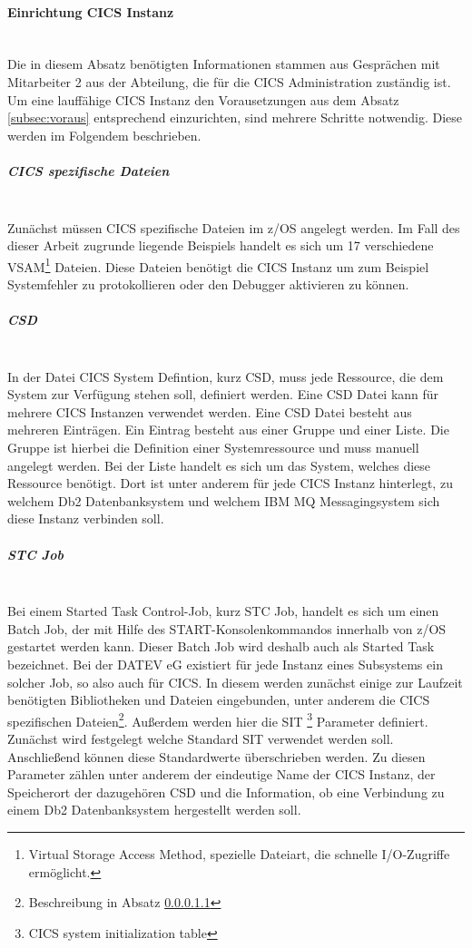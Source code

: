 \paragraph{Einrichtung CICS Instanz}\label{subsec:createCICS}~\\
Die in diesem Absatz benötigten Informationen stammen aus Gesprächen mit Mitarbeiter 2 aus der Abteilung, die für die CICS Administration zuständig ist.
Um eine lauffähige CICS Instanz den Vorausetzungen aus dem Absatz \ref{subsec:voraus} entsprechend einzurichten, sind mehrere Schritte notwendig.
Diese werden im Folgendem beschrieben.

\subparagraph{CICS spezifische Dateien}\label{sssec:speziDat} ~\\
Zunächst müssen CICS spezifische Dateien im z/OS angelegt werden.
Im Fall des dieser Arbeit zugrunde liegende Beispiels handelt es sich um 17 verschiedene VSAM\footnote{Virtual Storage Access Method, spezielle Dateiart, die schnelle I/O-Zugriffe ermöglicht.\cite{Lovelace.2013}} Dateien.
Diese Dateien benötigt die CICS Instanz um zum Beispiel Systemfehler zu protokollieren oder den Debugger aktivieren zu können.

\subparagraph{CSD} ~\\
In der Datei \glqq CICS System Defintion\grqq, kurz CSD, muss jede Ressource, die dem System zur Verfügung stehen soll, definiert werden.
Eine CSD Datei kann für mehrere CICS Instanzen verwendet werden.
Eine CSD Datei besteht aus mehreren Einträgen.
Ein Eintrag besteht aus einer Gruppe und einer Liste.
Die Gruppe ist hierbei die Definition einer Systemressource und muss manuell angelegt werden.
Bei der Liste handelt es sich um das System, welches diese Ressource benötigt.
Dort ist unter anderem für jede CICS Instanz hinterlegt, zu welchem Db2 Datenbanksystem und welchem IBM MQ Messagingsystem sich diese Instanz verbinden soll.

\subparagraph{STC Job} ~\\
Bei einem Started Task Control-Job, kurz STC Job, handelt es sich um einen Batch Job, der mit Hilfe des \glqq START\grqq-Konsolenkommandos innerhalb von z/OS gestartet werden kann.
Dieser Batch Job wird deshalb auch als Started Task bezeichnet.\cite{Cassier.2007}
Bei der DATEV eG existiert für jede Instanz eines Subsystems ein solcher Job, so also auch für CICS.
In diesem werden zunächst einige zur Laufzeit benötigten Bibliotheken und Dateien eingebunden, unter anderem die CICS spezifischen Dateien\footnote{Beschreibung in Absatz \ref{sssec:speziDat}}.
Außerdem werden hier die SIT \footnote{CICS system initialization table} Parameter definiert.
Zunächst wird festgelegt welche Standard SIT verwendet werden soll.
Anschließend können diese Standardwerte überschrieben werden.
Zu diesen Parameter zählen unter anderem der eindeutige Name der CICS Instanz, der Speicherort der dazugehören CSD und die Information, ob eine Verbindung zu einem Db2 Datenbanksystem hergestellt werden soll.

